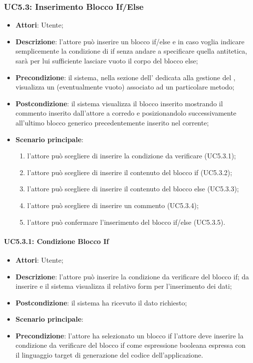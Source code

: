 \subsubsection{UC5.3: Inserimento Blocco If/Else}
\label{UC5.3}
\begin{itemize}
	\item \textbf{Attori}: Utente;
	\item \textbf{Descrizione}: l'attore può inserire un blocco if/else e in caso voglia indicare semplicemente la condizione di if senza andare a specificare quella antitetica, sarà per lui sufficiente lasciare vuoto il corpo del blocco else;
	\item \textbf{Precondizione}: il sistema, nella sezione dell' dedicata alla gestione del , visualizza un  (eventualmente vuoto) associato ad un particolare metodo;
	\item \textbf{Postcondizione}: il sistema visualizza il blocco inserito mostrando il commento inserito dall'attore a corredo e posizionandolo successivamente all'ultimo blocco generico precedentemente inserito nel  corrente;
	\item \textbf{Scenario principale}:
	\begin{enumerate}
		\item l'attore può scegliere di inserire la condizione da verificare (UC5.3.1);
		\item l'attore può scegliere di inserire il contenuto del blocco if (UC5.3.2);
		\item l'attore può scegliere di inserire il contenuto del blocco else (UC5.3.3);
		\item l'attore può scegliere di inserire un commento (UC5.3.4);
		\item l'attore può confermare l'inserimento del blocco if/else (UC5.3.5).
	\end{enumerate}
\end{itemize}

\paragraph{UC5.3.1: Condizione Blocco If}
\label{UC5.3.1}
\begin{itemize}
	\item \textbf{Attori}: Utente;
	\item \textbf{Descrizione}: l'attore può inserire la condizione da verificare del blocco if; da inserire e il sistema visualizza il relativo form per l'inserimento dei dati;
	\item \textbf{Postcondizione}: il sistema ha ricevuto il dato richiesto;
	\item \textbf{Scenario principale}:
	\item \textbf{Precondizione}: l'attore ha selezionato un blocco if
	l'attore deve inserire la condizione da verificare del blocco if come espressione booleana espressa con il linguaggio target di generazione del codice dell'applicazione.
\end{itemize}

